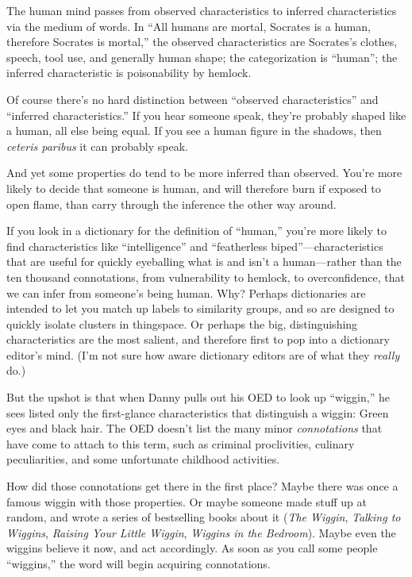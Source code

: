 {
 The human mind passes from observed characteristics to inferred
characteristics via the medium of words. In ``All
humans are mortal, Socrates is a human, therefore Socrates is
mortal,'' the observed characteristics are
Socrates's clothes, speech, tool use, and generally
human shape; the categorization is
``human''; the inferred
characteristic is poisonability by hemlock.}

{
 Of course there's no hard distinction between
``observed characteristics'' and
``inferred characteristics.'' If you
hear someone speak, they're probably shaped like a
human, all else being equal. If you see a human figure in the shadows,
then \textit{ceteris paribus} it can probably speak.}

{
 And yet some properties do tend to be more inferred than observed.
You're more likely to decide that someone is human, and
will therefore burn if exposed to open flame, than carry through the
inference the other way around.}

{
 If you look in a dictionary for the definition of
``human,'' you're
more likely to find characteristics like
``intelligence'' and
``featherless
biped''---characteristics that are useful for quickly
eyeballing what is and isn't a human---rather than the
ten thousand connotations, from vulnerability to hemlock, to
overconfidence, that we can infer from someone's being
human. Why? Perhaps dictionaries are intended to let you match up
labels to similarity groups, and so are designed to quickly isolate
clusters in thingspace. Or perhaps the big, distinguishing
characteristics are the most salient, and therefore first to pop into a
dictionary editor's mind. (I'm not sure
how aware dictionary editors are of what they \textit{really} do.)}

{
 But the upshot is that when Danny pulls out his OED to look up
``wiggin,'' he sees listed only the
first-glance characteristics that distinguish a wiggin: Green eyes and
black hair. The OED doesn't list the many minor
\textit{connotations} that have come to attach to this term, such as
criminal proclivities, culinary peculiarities, and some unfortunate
childhood activities.}

{
 How did those connotations get there in the first place? Maybe
there was once a famous wiggin with those properties. Or maybe someone
made stuff up at random, and wrote a series of bestselling books about
it (\textit{The Wiggin}, \textit{Talking to Wiggins}, \textit{Raising
Your Little Wiggin}, \textit{Wiggins in the Bedroom}). Maybe even the
wiggins believe it now, and act accordingly. As soon as you call some
people ``wiggins,'' the word will
begin acquiring connotations.}

